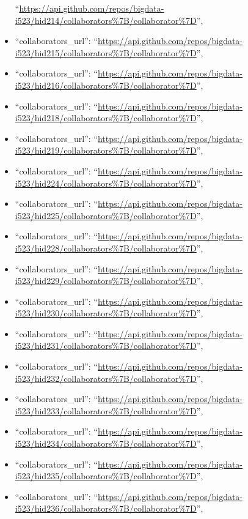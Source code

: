 \begin{itemize}
  ``\url{https://api.github.com/repos/bigdata-i523/hid214/collaborators\%7B/collaborator\%7D}'',
\item
  ``collaborators\_url'':
  ``\url{https://api.github.com/repos/bigdata-i523/hid215/collaborators\%7B/collaborator\%7D}'',
\item
  ``collaborators\_url'':
  ``\url{https://api.github.com/repos/bigdata-i523/hid216/collaborators\%7B/collaborator\%7D}'',
\item
  ``collaborators\_url'':
  ``\url{https://api.github.com/repos/bigdata-i523/hid218/collaborators\%7B/collaborator\%7D}'',
\item
  ``collaborators\_url'':
  ``\url{https://api.github.com/repos/bigdata-i523/hid219/collaborators\%7B/collaborator\%7D}'',
\item
  ``collaborators\_url'':
  ``\url{https://api.github.com/repos/bigdata-i523/hid224/collaborators\%7B/collaborator\%7D}'',
\item
  ``collaborators\_url'':
  ``\url{https://api.github.com/repos/bigdata-i523/hid225/collaborators\%7B/collaborator\%7D}'',
\item
  ``collaborators\_url'':
  ``\url{https://api.github.com/repos/bigdata-i523/hid228/collaborators\%7B/collaborator\%7D}'',
\item
  ``collaborators\_url'':
  ``\url{https://api.github.com/repos/bigdata-i523/hid229/collaborators\%7B/collaborator\%7D}'',
\item
  ``collaborators\_url'':
  ``\url{https://api.github.com/repos/bigdata-i523/hid230/collaborators\%7B/collaborator\%7D}'',
\item
  ``collaborators\_url'':
  ``\url{https://api.github.com/repos/bigdata-i523/hid231/collaborators\%7B/collaborator\%7D}'',
\item
  ``collaborators\_url'':
  ``\url{https://api.github.com/repos/bigdata-i523/hid232/collaborators\%7B/collaborator\%7D}'',
\item
  ``collaborators\_url'':
  ``\url{https://api.github.com/repos/bigdata-i523/hid233/collaborators\%7B/collaborator\%7D}'',
\item
  ``collaborators\_url'':
  ``\url{https://api.github.com/repos/bigdata-i523/hid234/collaborators\%7B/collaborator\%7D}'',
\item
  ``collaborators\_url'':
  ``\url{https://api.github.com/repos/bigdata-i523/hid235/collaborators\%7B/collaborator\%7D}'',
\item
  ``collaborators\_url'':
  ``\url{https://api.github.com/repos/bigdata-i523/hid236/collaborators\%7B/collaborator\%7D}'',

\end{itemize}
